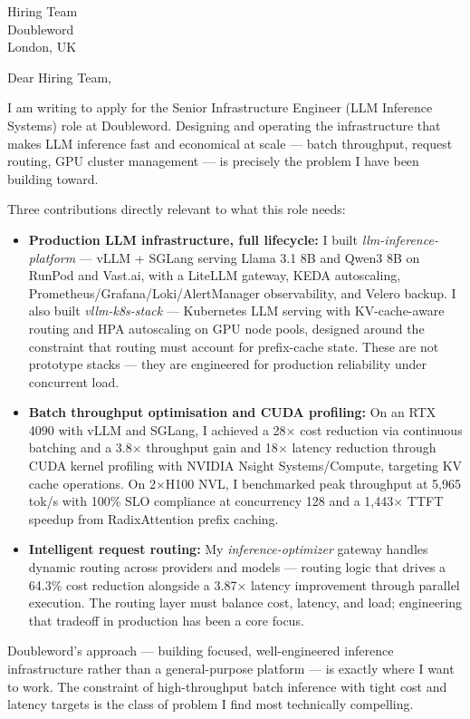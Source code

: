 \documentclass[11pt,a4paper]{letter}
\date{\today}
\begin{document}
\begin{letter}{Hiring Team \\ Doubleword \\ London, UK}

\opening{Dear Hiring Team,}

I am writing to apply for the Senior Infrastructure Engineer (LLM Inference Systems) role at Doubleword. Designing and operating the infrastructure that makes LLM inference fast and economical at scale — batch throughput, request routing, GPU cluster management — is precisely the problem I have been building toward.

Three contributions directly relevant to what this role needs:

\begin{itemize}
  \item \textbf{Production LLM infrastructure, full lifecycle:} I built \textit{llm-inference-platform} — vLLM + SGLang serving Llama 3.1 8B and Qwen3 8B on RunPod and Vast.ai, with a LiteLLM gateway, KEDA autoscaling, Prometheus/Grafana/Loki/AlertManager observability, and Velero backup. I also built \textit{vllm-k8s-stack} — Kubernetes LLM serving with KV-cache-aware routing and HPA autoscaling on GPU node pools, designed around the constraint that routing must account for prefix-cache state. These are not prototype stacks — they are engineered for production reliability under concurrent load.

  \item \textbf{Batch throughput optimisation and CUDA profiling:} On an RTX 4090 with vLLM and SGLang, I achieved a 28$\times$ cost reduction via continuous batching and a 3.8$\times$ throughput gain and 18$\times$ latency reduction through CUDA kernel profiling with NVIDIA Nsight Systems/Compute, targeting KV cache operations. On 2$\times$H100 NVL, I benchmarked peak throughput at 5,965 tok/s with 100\% SLO compliance at concurrency 128 and a 1,443$\times$ TTFT speedup from RadixAttention prefix caching.

  \item \textbf{Intelligent request routing:} My \textit{inference-optimizer} gateway handles dynamic routing across providers and models — routing logic that drives a 64.3\% cost reduction alongside a 3.87$\times$ latency improvement through parallel execution. The routing layer must balance cost, latency, and load; engineering that tradeoff in production has been a core focus.
\end{itemize}

Doubleword's approach — building focused, well-engineered inference infrastructure rather than a general-purpose platform — is exactly where I want to work. The constraint of high-throughput batch inference with tight cost and latency targets is the class of problem I find most technically compelling.


\end{letter}
\end{document}
